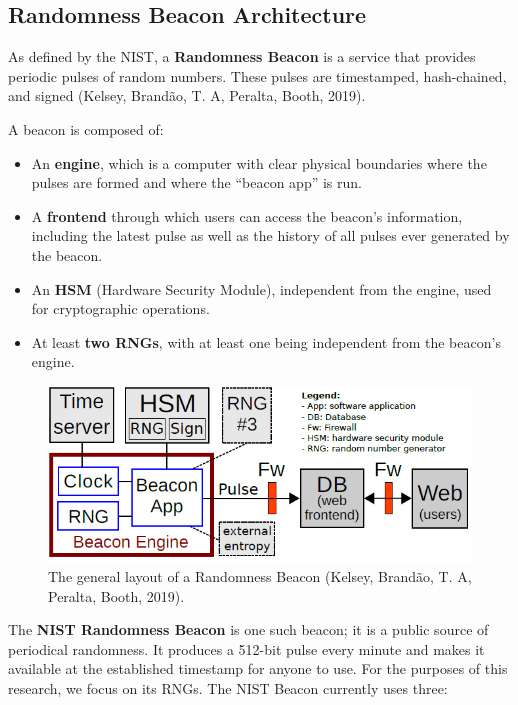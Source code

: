 \subsection{Randomness Beacon Architecture}

As defined by the NIST, a \textbf{Randomness Beacon} is a service that provides periodic pulses of random numbers. These pulses are timestamped, hash-chained, and signed (Kelsey, Brand\~{a}o, T. A, Peralta, Booth, 2019).

A beacon is composed of:
\begin{itemize}
    \item An \textbf{engine}, which is a computer with clear physical boundaries where the pulses are formed and where the ``beacon app'' is run.
    \item A \textbf{frontend} through which users can access the beacon's information, including the latest pulse as well as the history of all pulses ever generated by the beacon.
    \item An \textbf{HSM} (Hardware Security Module), independent from the engine, used for cryptographic operations.
    \item At least \textbf{two RNGs}, with at least one being independent from the beacon's engine.
\end{itemize}

\begin{figure}[h]
    \centering
    \includegraphics[width=\columnwidth]{images/ArchitectureNISTBeacon.PNG}
    \caption{The general layout of a Randomness Beacon (Kelsey, Brand\~{a}o, T. A, Peralta, Booth, 2019).}
    \label{fig:beacon-architecture}
\end{figure}

The \textbf{NIST Randomness Beacon} is one such beacon; it is a public source of periodical randomness. It produces a 512-bit pulse every minute and makes it available at the established timestamp for anyone to use. For the purposes of this research, we focus on its RNGs. The NIST Beacon currently uses three:

